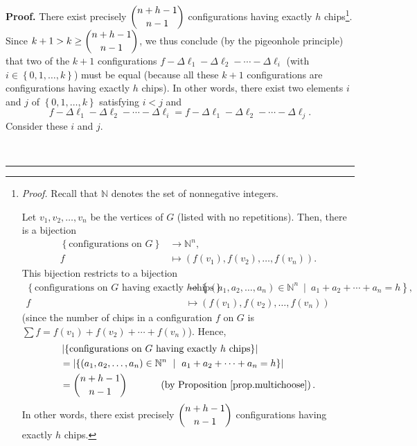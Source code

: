 \documentclass[numbers=enddot,12pt,final,onecolumn,notitlepage]{scrartcl}%
\theoremstyle{definition}
\newenvironment{proof}[1][Proof]{\noindent\textbf{#1.} }{\ \rule{0.5em}{0.5em}}
\let\sumnonlimits\sum
\renewcommand{\sum}{\sumnonlimits\limits}
\begin{document}
\begin{proof}
There exist precisely $\dbinom{n+h-1}{n-1}$ configurations having exactly $h$
chips\footnote{\textit{Proof.} Recall that $\mathbb{N}$ denotes the set of
nonnegative integers.
\par
Let $v_{1},v_{2},\ldots,v_{n}$ be the vertices of $G$ (listed with no
repetitions). Then, there is a bijection%
\begin{align*}
\left\{  \text{configurations on }G\right\}   &  \rightarrow\mathbb{N}^{n},\\
f  &  \mapsto\left(  f\left(  v_{1}\right)  ,f\left(  v_{2}\right)
,\ldots,f\left(  v_{n}\right)  \right)  .
\end{align*}
This bijection restricts to a bijection%
\begin{align*}
\left\{  \text{configurations on }G\text{ having exactly }h\text{
chips}\right\}   &  \rightarrow\left\{  \left(  a_{1},a_{2},\ldots
,a_{n}\right)  \in\mathbb{N}^{n}\ \mid\ a_{1}+a_{2}+\cdots+a_{n}=h\right\}
,\\
f  &  \mapsto\left(  f\left(  v_{1}\right)  ,f\left(  v_{2}\right)
,\ldots,f\left(  v_{n}\right)  \right)
\end{align*}
(since the number of chips in a configuration $f$ on $G$ is $\sum f=f\left(
v_{1}\right)  +f\left(  v_{2}\right)  +\cdots+f\left(  v_{n}\right)  $).
Hence,%
\begin{align*}
&  \left\vert \left\{  \text{configurations on }G\text{ having exactly
}h\text{ chips}\right\}  \right\vert \\
&  =\left\vert \left\{  \left(  a_{1},a_{2},\ldots,a_{n}\right)  \in
\mathbb{N}^{n}\ \mid\ a_{1}+a_{2}+\cdots+a_{n}=h\right\}  \right\vert \\
&  =\dbinom{n+h-1}{n-1}\ \ \ \ \ \ \ \ \ \ \left(  \text{by Proposition
\ref{prop.multichoose}}\right)  .
\end{align*}
In other words, there exist precisely $\dbinom{n+h-1}{n-1}$ configurations
having exactly $h$ chips.}. Since $k+1>k\geq\dbinom{n+h-1}{n-1}$, we thus
conclude (by the pigeonhole principle) that two of the $k+1$ configurations
$f-\Delta\ell_{1}-\Delta\ell_{2}-\cdots-\Delta\ell_{i}$ (with $i\in\left\{
0,1,\ldots,k\right\}  $) must be equal (because all these $k+1$ configurations
are configurations having exactly $h$ chips). In other words, there exist two
elements $i$ and $j$ of $\left\{  0,1,\ldots,k\right\}  $ satisfying $i<j$ and%
\begin{equation}
f-\Delta\ell_{1}-\Delta\ell_{2}-\cdots-\Delta\ell_{i}=f-\Delta\ell_{1}%
-\Delta\ell_{2}-\cdots-\Delta\ell_{j}. \label{sol.chip.better-bounds.ivsj}%
\end{equation}
Consider these $i$ and $j$.


\end{proof}
\end{document}
